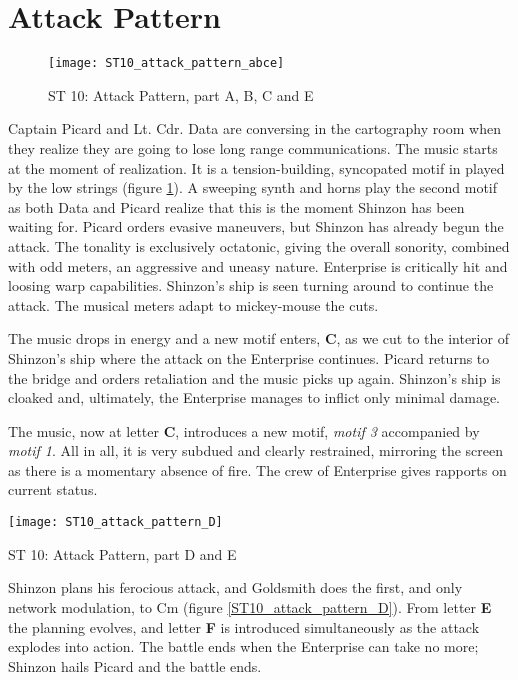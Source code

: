 \section{Attack Pattern}\label{sec:attack pattern}
\begin{figure}[h!]
\center
\texttt{[image: ST10\_attack\_pattern\_abce]}
	\caption{ST 10: Attack Pattern, part A, B, C and E}
	\label{ST10_attack_pattern_abce}
\end{figure}
\noindent Captain Picard and Lt. Cdr. Data are conversing in the cartography room when they realize they are going to lose long range communications. The music starts at the moment of realization. It is a tension-building, syncopated motif in  played by the low strings (figure \ref{ST10_attack_pattern_abce}). A sweeping synth and horns play the second motif as both Data and Picard realize that this is the moment Shinzon has been waiting for. Picard orders evasive maneuvers, but Shinzon has already begun the attack. The tonality is exclusively octatonic, giving the overall sonority, combined with odd meters, an aggressive and uneasy nature. Enterprise is critically hit and loosing warp capabilities. Shinzon's ship is seen turning around to continue the attack. The musical meters adapt to mickey-mouse the cuts. 

The music drops in energy and a new motif enters, \textbf{C}, as we cut to the interior of Shinzon's ship where the attack on the Enterprise continues. Picard returns to the bridge and orders retaliation and the music picks up again. Shinzon's ship is cloaked and, ultimately, the Enterprise manages to inflict only minimal damage. 

The music, now at letter \textbf{C}, introduces a new motif, \textit{motif 3} accompanied by \textit{motif 1}. All in all, it is very subdued and clearly restrained, mirroring the screen as there is a momentary absence of fire. The crew of Enterprise gives rapports on current status. 

\begin{marginfigure}
\texttt{[image: ST10\_attack\_pattern\_D]}
	\caption{ST 10: Attack Pattern, part D and E}
	\label{ST10_attack_pattern_D}
\end{marginfigure}

Shinzon plans his ferocious attack, and Goldsmith does the first, and only network modulation, to Cm (figure \ref{ST10_attack_pattern_D}). From letter \textbf{E} the planning evolves, and letter \textbf{F} is introduced simultaneously as the attack explodes into action. The battle ends when the Enterprise can take no more; Shinzon hails Picard and the battle ends. 
\clearpage
 

